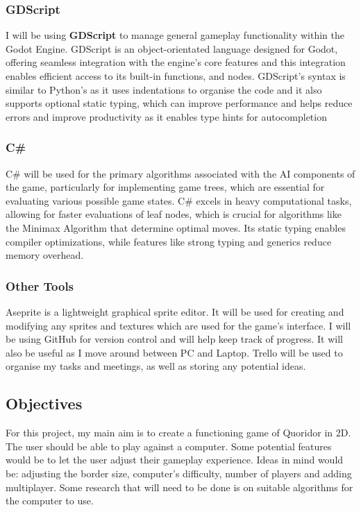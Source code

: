 \documentclass[review]{cmpreport}
\begin{document}
\subsubsection{GDScript}
I will be using \textbf{GDScript} to manage general gameplay functionality within the Godot Engine. GDScript is an object-orientated language designed for Godot, offering seamless integration with the engine's core features and this integration enables efficient access to its built-in functions, and nodes. GDScript's syntax is similar to Python's as it uses indentations to organise the code and it also supports optional static typing, which can improve performance and helps reduce errors and improve productivity as it enables type hints for autocompletion

\subsubsection{C\#}
C\# will be used for the primary algorithms associated with the AI components of the game, particularly for implementing game trees, which are essential for evaluating various possible game states. C\# excels in heavy computational tasks, allowing for faster evaluations of leaf nodes, which is crucial for algorithms like the Minimax Algorithm that determine optimal moves. Its static typing enables compiler optimizations, while features like strong typing and generics reduce memory overhead.

\subsubsection{Other Tools}
Aseprite is a lightweight graphical sprite editor. It will be used for creating and modifying any sprites and textures which are used for the game's interface. I will be using GitHub for version control and will help keep track of progress. It will also be useful as I move around between PC and Laptop. Trello will be used to organise my tasks and meetings, as well as storing any potential ideas.

\subsection{Objectives}
For this project, my main aim is to create a functioning game of Quoridor in 2D. The user should be able to play against a computer. Some potential features would be to let the user adjust their gameplay experience. Ideas in mind would be: adjusting the border size, computer's difficulty, number of players and adding multiplayer. Some research that will need to be done is on suitable algorithms for the computer to use.\newline
\end{document}
